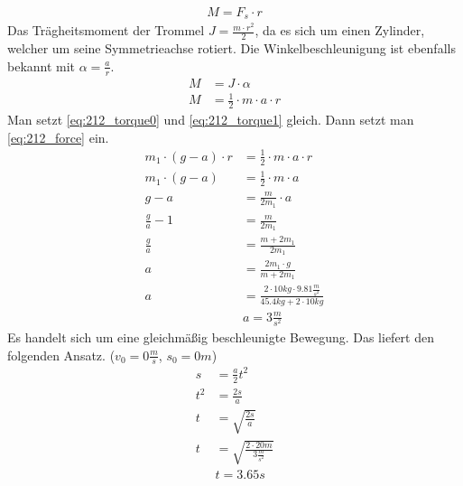 \documentclass{article}
\begin{document}
	\begin{align}
		M=F_s\cdot r	\label{eq:212_torque0}
	\end{align}
	Das Trägheitsmoment der Trommel $J=\frac{m\cdot r^2}{2}$, da es sich um einen Zylinder, welcher um seine Symmetrieachse rotiert. Die Winkelbeschleunigung ist ebenfalls bekannt mit $\alpha=\frac{a}{r}$.
	\begin{align}
		M&=J\cdot\alpha	\nonumber\\
		M&=\frac{1}{2}\cdot m\cdot a\cdot r	\label{eq:212_torque1}
	\end{align}
	Man setzt \eqref{eq:212_torque0} und \eqref{eq:212_torque1} gleich. Dann setzt man \eqref{eq:212_force} ein.
	\begin{align*}
		m_1\cdot(g-a)\cdot r&=\frac{1}{2}\cdot m\cdot a\cdot r\\
		m_1\cdot(g-a)&=\frac{1}{2}\cdot m\cdot a\\
		g-a&=\frac{m}{2m_1}\cdot a\\
		\frac{g}{a}-1&=\frac{m}{2m_1}\\
		\frac{g}{a}&=\frac{m+2m_1}{2m_1}\\
		a&=\frac{2m_1\cdot g}{m+2m_1}\\
		a&=\frac{2\cdot10kg\cdot9.81\frac{m}{s^2}}{45.4kg+2\cdot10kg}\\
		&\boxed{a=3\frac{m}{s^2}}	\tag{a}	\label{eq:212_a}
	\end{align*}
	Es handelt sich um eine gleichmäßig beschleunigte Bewegung. Das liefert den folgenden Ansatz. ($v_0=0\frac{m}{s}$, $s_0=0m$)
	\begin{align*}
		s&=\frac{a}{2}t^2\\
		t^2&=\frac{2s}{a}\\
		t&=\sqrt{\frac{2s}{a}}\\
		t&=\sqrt{\frac{2\cdot20m}{3\frac{m}{s^2}}}\\
		&\boxed{t=3.65s}	\tag{b}	\label{eq:212_b}
	\end{align*}
	\newpage
	
\end{document}
